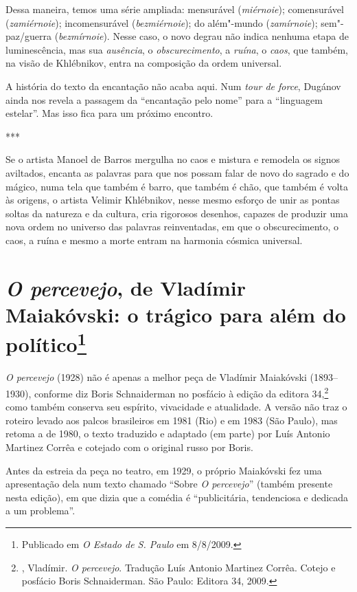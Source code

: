 Dessa maneira, temos uma série ampliada: mensurável (\emph{miérnoie});
comensurável (\emph{zamiérnoie}); incomensurável (\emph{bezmiérnoie});
do além"-mundo (\emph{zamírnoie}); sem"-paz/guerra (\emph{bezmírnoie}).
Nesse caso, o novo degrau não indica nenhuma etapa de luminescência, mas
sua \emph{ausência}, o \emph{obscurecimento}, a \emph{ruína}, o \emph{caos}, que também, na visão de
Khlébnikov, entra na composição da ordem universal.

A história do texto da encantação não acaba aqui. Num
\emph{tour de force}, Dugánov ainda nos revela a passagem da
``encantação pelo nome'' para a ``linguagem estelar''. Mas isso fica
para um próximo encontro.

\begin{center}
***
\end{center}

Se o artista Manoel de Barros mergulha no caos e mistura e remodela os
signos aviltados, encanta as palavras para que nos possam falar de novo
do sagrado e do mágico, numa tela que também é barro, que também é chão,
que também é volta às origens, o artista Velimir Khlébnikov, nesse mesmo
esforço de unir as pontas soltas da natureza e da cultura, cria
rigorosos desenhos, capazes de produzir uma nova ordem no universo das
palavras reinventadas, em que o obscurecimento, o caos, a ruína e mesmo
a morte entram na harmonia cósmica universal.

\chapter{\emph{O percevejo}, de Vladímir Maiakóvski: o trágico
para além do político\footnote{Publicado em \emph{O Estado de S.
Paulo} em 8/8/2009.}}

\emph{O percevejo} (1928) não é apenas a melhor peça de Vladímir
Maiakóvski (1893--1930), conforme diz Boris Schnaiderman no posfácio à
edição da editora 34,\footnote{, Vladímir.
\emph{O percevejo}. Tradução Luís Antonio Martinez Corrêa. Cotejo
e posfácio Boris Schnaiderman. São Paulo: Editora 34, 2009.} como
também conserva seu espírito, vivacidade e atualidade. A versão
não traz o roteiro levado aos palcos brasileiros em 1981 (Rio)
e em 1983 (São Paulo), mas retoma a de 1980, o texto traduzido
e adaptado (em parte) por Luís Antonio Martinez Corrêa e cotejado
com o original russo por Boris.

Antes da estreia da peça no teatro, em 1929, o próprio Maiakóvski fez
uma apresentação dela num texto chamado ``Sobre \emph{O percevejo}''
(também presente nesta edição), em que dizia que a comédia é
``publicitária, tendenciosa e dedicada a um problema''.

